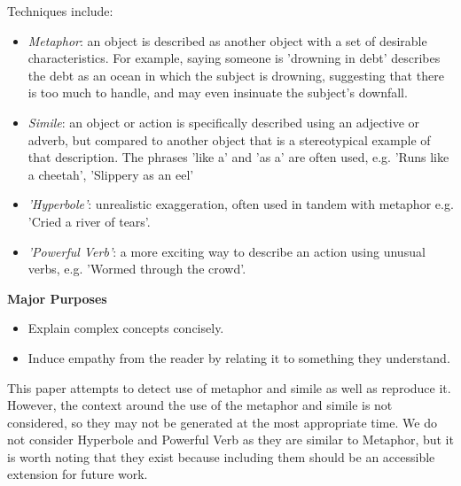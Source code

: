 Techniques include:
\begin{itemize}
\item{\textit{Metaphor}: an object is described as another object with a set of desirable characteristics. For example, saying someone is 'drowning in debt' describes the debt as an ocean in which the subject is drowning, suggesting that there is too much to handle, and may even insinuate the subject's downfall.}
\item{\textit{Simile}: an object or action is specifically described using an adjective or adverb, but compared to another object that is a stereotypical example of that description. The phrases 'like a' and 'as a' are often used, e.g. 'Runs like a cheetah', 'Slippery as an eel'}
\item{\textit{'Hyperbole'}: unrealistic exaggeration, often used in tandem with metaphor e.g. 'Cried a river of tears'.}
\item{\textit{'Powerful Verb'}: a more exciting way to describe an action using unusual verbs, e.g. 'Wormed through the crowd'.}
\end{itemize}

\textbf{Major Purposes}
\begin{itemize}
\item{Explain complex concepts concisely.}
\item{Induce empathy from the reader by relating it to something they understand.}
\end{itemize} 

This paper attempts to detect use of metaphor and simile as well as reproduce it. However, the context around the use of the metaphor and simile is not considered, so they may not be generated at the most appropriate time. We do not consider Hyperbole and Powerful Verb as they are similar to Metaphor, but it is worth noting that they exist because including them should be an accessible extension for future work.

